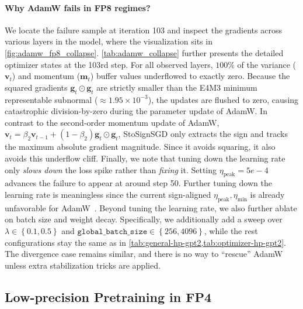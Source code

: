 \documentclass{article}
\def \v {\mathbf{v}}
\def \g {\mathbf{g}}
\def \m {\mathbf{m}}
\newcommand{\cbrac}[1]{\left\{#1\right\}}
\begin{document}
\paragraph{Why AdamW fails in FP8 regimes?}
We locate the failure sample at iteration 103 and inspect the gradients across various layers in the model, where the visualization sits in \cref{fig:adamw_fp8_collapse}. \cref{tab:adamw_collapse} further presents the detailed optimizer states at the 103rd step. For all observed layers, $100\%$ of the variance ($\v_t$) and momentum ($\m_t$) buffer values underflowed to exactly zero. Because the squared gradients $\g_t\odot\g_t$ are strictly smaller than the E4M3 minimum representable subnormal ($\approx 1.95 \times 10^{-3}$), the updates are flushed to zero, causing catastrophic division-by-zero during the parameter update of AdamW. In contrast to the second-order momentum update of AdamW, $\v_t=\beta_2\v_{t-1}+(1-\beta_2)\g_t\odot\g_t$, StoSignSGD only extracts the sign and tracks the maximum absolute gradient magnitude. Since it avoids squaring, it also avoids this underflow cliff. Finally, we note that tuning down the learning rate only \emph{slows down} the loss spike rather than \emph{fixing} it. Setting $\eta_\text{peak}=5e-4$ advances the failure to appear at around step 50. Further tuning down the learning rate is meaningless since the current sign-aligned $\eta_\text{peak},\eta_\text{min}$ is already unfavorable for AdamW~\citep{liu2025muon,wen2026fantastic,liang2026cautious}. Beyond tuning the learning rate, we also further ablate on batch size and weight decay. Specifically, we additionally add a sweep over $\lambda\in\cbrac{0.1,0.5}$ and $\mathtt{global\_batch\_size}\in\cbrac{256,4096}$, while the rest configurations stay the same as in \cref{tab:general-hp-gpt2,tab:optimizer-hp-gpt2}. The divergence case remains similar, and there is no way to ``rescue'' AdamW unless extra stabilization tricks are applied.

\subsection{Low-precision Pretraining in FP4\label{sec:fp4-cont}}
\end{document}
